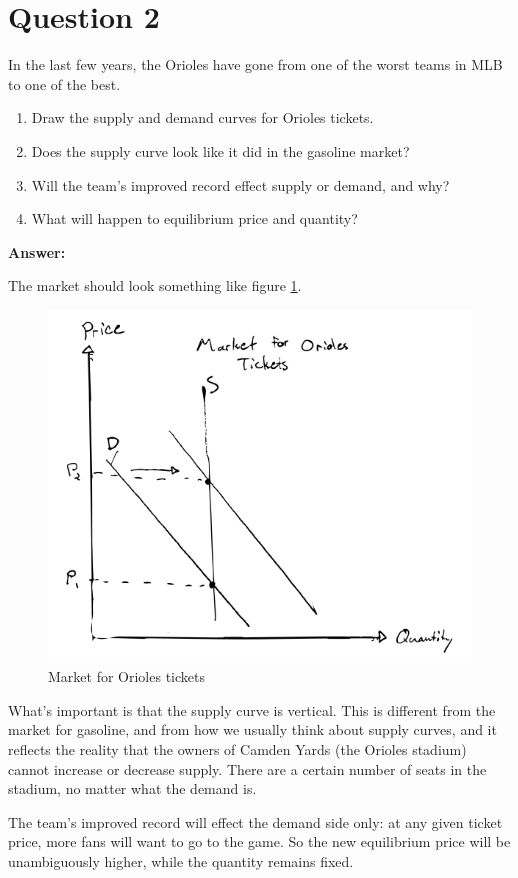 \documentclass[12pt]{article}
\begin{document}
\section*{Question 2}
In the last few years, the Orioles have gone from one of the worst teams in MLB to one of the best.

\begin{enumerate}
    \item Draw the supply and demand curves for Orioles tickets.
    \item Does the supply curve look like it did in the gasoline market?
    \item Will the team's improved record effect supply or demand, and why?
    \item What will happen to equilibrium price and quantity?
\end{enumerate}

\textbf{Answer:}

The market should look something like figure \ref{fig:orioles}.

\begin{figure}
    \centering
    \includegraphics[width=.6\textwidth]{orioles.png}
    \caption{Market for Orioles tickets}
    \label{fig:orioles}
\end{figure}

What's important is that the supply curve is vertical. This is different from the market for gasoline, and from how we usually think about supply curves, and it reflects the reality that the owners of Camden Yards (the Orioles stadium) cannot increase or decrease supply. There are a certain number of seats in the stadium, no matter what the demand is.

\medskip

The team's improved record will effect the demand side only: at any given ticket price, more fans will want to go to the game. So the new equilibrium price will be unambiguously higher, while the quantity remains fixed.
\end{document}

